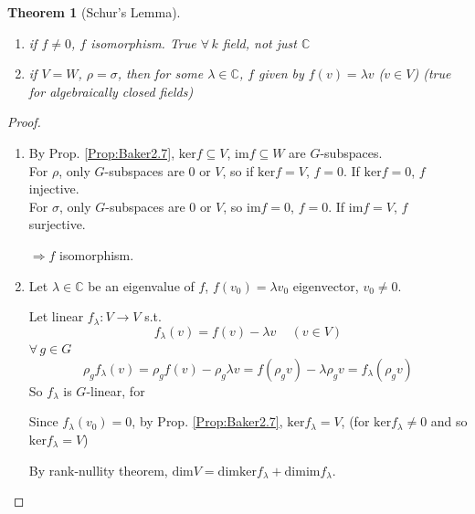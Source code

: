\documentclass[10pt]{amsart}
\newtheorem{theorem}{Theorem}
\begin{document}
\begin{multicols*}{2}
\begin{theorem}[Schur's Lemma]
	\begin{enumerate}
		\item[(a)] if $f\neq 0$, $f$ isomorphism.  True $\forall \, k$ field, not just $\mathbb{C}$
		\item[(b)] if $V=W$, $\rho = \sigma$, then for some $\lambda \in \mathbb{C}$, $f$ given by $f(v) = \lambda v$ ($v\in V$) (true for algebraically closed fields)
	\end{enumerate}
\end{theorem}

\begin{proof}
	\begin{enumerate}
		\item[(a)] By Prop. \ref{Prop:Baker2.7}, $\text{ker}f \subseteq V$, $\text{im}f \subseteq W$ are $G$-subspaces.  \\
		For $\rho$, only $G$-subspaces are $0$ or $V$, so if $\text{ker}f = V$, $f=0$.  If $\text{ker}f = 0$, $f$ injective.  \\
		For $\sigma$, only $G$-subspaces are $0$ or $V$, so $\text{im}f =0 $, $f=0$.  If $\text{im}f =V$, $f$ surjective.  
		
		$\Longrightarrow f$ isomorphism.  
		\item[(b)] Let $\lambda \in \mathbb{C}$ be an eigenvalue of $f$, $f(v_0) = \lambda v_0$ eigenvector, $v_0 \neq 0$.  
		
		Let linear $f_{\lambda} : V \to V$ s.t. 
		\[
		f_{\lambda}(v) = f(v) - \lambda v \quad \, (v\in V)
		\]
		$\forall \, g \in G$
		\[
		\rho_g f_{\lambda}(v) = \rho_gf(v) - \rho_g \lambda v = f(\rho_g v) - \lambda \rho_g v= f_{\lambda}(\rho_g v)
		\]
		So $f_{\lambda}$ is $G$-linear, for 
		
		
		Since $f_{\lambda}(v_0) =0$, by Prop. \ref{Prop:Baker2.7}, $\text{ker}f_{\lambda} = V$, (for $\text{ker}f_{\lambda}\neq 0$ and so $\text{ker}f_{\lambda}=V$)
		
		By rank-nullity theorem, $\text{dim}V = \text{dim}\text{ker}f_{\lambda} + \text{dim}\text{im}f_{\lambda}$.  
		

\end{enumerate}
\end{proof}
\end{multicols*}
\end{document}
